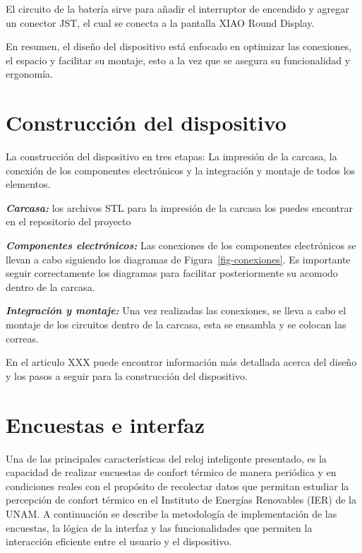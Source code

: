 \documentclass[
  letterpaper,
  DIV=11,
  numbers=noendperiod]{scrreport}
\begin{document}
El circuito de la batería sirve para añadir el interruptor de encendido
y agregar un conector JST, el cual se conecta a la pantalla XIAO Round
Display.

En resumen, el diseño del dispositivo está enfocado en optimizar las
conexiones, el espacio y facilitar su montaje, esto a la vez que se
asegura su funcionalidad y ergonomía.

\hypertarget{sec-construccion}{%
\section{Construcción del dispositivo}\label{sec-construccion}}

La construcción del dispositivo en tres etapas: La impresión de la
carcasa, la conexión de los componentes electrónicos y la integración y
montaje de todos los elementos.

\textbf{\emph{Carcasa:}} los archivos STL para la impresión de la
carcasa los puedes encontrar en el repositorio del proyecto

\textbf{\emph{Componentes electrónicos:}} Las conexiones de los
componentes electrónicos se llevan a cabo siguiendo los diagramas de
Figura~\ref{fig-conexiones}. Es importante seguir correctamente los
diagramas para facilitar posteriormente su acomodo dentro de la carcasa.

\textbf{\emph{Integración y montaje:}} Una vez realizadas las
conexiones, se lleva a cabo el montaje de los circuitos dentro de la
carcasa, esta se ensambla y se colocan las correas.

En el articulo XXX puede encontrar información más detallada acerca del
diseño y los pasos a seguir para la construcción del dispositivo.

\hypertarget{sec-encuestas}{%
\section{Encuestas e interfaz}\label{sec-encuestas}}

Una de las principales características del reloj inteligente presentado,
es la capacidad de realizar encuestas de confort térmico de manera
periódica y en condiciones reales con el propósito de recolectar datos
que permitan estudiar la percepción de confort térmico en el Instituto
de Energías Renovables (IER) de la UNAM. A continuación se describe la
metodología de implementación de las encuestas, la lógica de la interfaz
y las funcionalidades que permiten la interacción eficiente entre el
usuario y el dispositivo.
\end{document}
